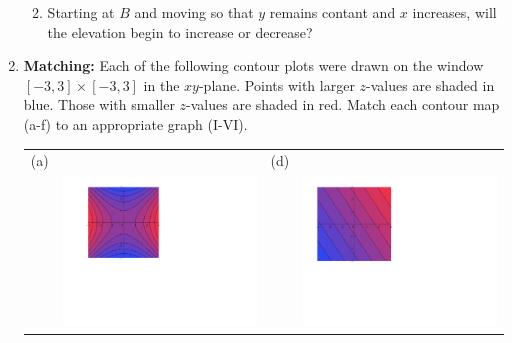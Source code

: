 \documentclass[12pt]{article}
\newif\ifans
\begin{document}
\begin{enumerate}
\begin{enumerate}
{} \fi

\item Starting at $B$ and moving so that $y$ remains contant and $x$ increases, will the elevation begin to increase or decrease?

\ifans{\fbox{Decrease}}\fi

\end{enumerate}

\newpage

\item {\bf Matching:} Each of the following contour plots were drawn on the window $[-3,3]\times[-3,3]$ in the $xy$-plane.  Points with larger $z$-values are shaded in blue.  Those with smaller $z$-values are shaded in red.  Match each contour map (a-f) to an appropriate graph (I-VI).

\begin{center}
\begin{tabular}{lc|cc}
(a)&&(d)\\
&\includegraphics[scale=0.52]{matching1.pdf} &\hspace{0.5 cm}& \includegraphics[scale=0.5]{matching4.pdf}\\

\end{tabular}
\end{center}
\end{enumerate}
\end{document}
